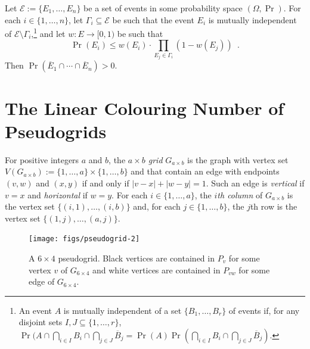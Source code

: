 \documentclass{patmorin}
\newcommand{\defin}[1]{\emph{\color{brown}#1}}
\begin{document}
\begin{lem}\label{weighted_lovasz}
  Let $\mathcal{E}:=\{E_1,\ldots,E_n\}$ be a set of events in some probability space $(\Omega,\Pr)$.  For each $i\in\{1,\ldots,n\}$, let $\Gamma_i\subseteq \mathcal{E}$ be such that the event $E_i$ is mutually independent of $\mathcal{E}\setminus \Gamma_i$,\footnote{An event $A$ is mutually independent of a set $\{B_1,\ldots,B_r\}$ of events if, for any disjoint sets $I,J\subseteq\{1,\ldots,r\}$, $\Pr(A\cap\bigcap_{i\in I} B_i\cap\bigcap_{j\in J} \overline{B}_j=\Pr(A)\Pr(\bigcap_{i\in I} B_i\cap\bigcap_{j\in J} \overline{B}_j)$.} and let $w:E\to[0,1)$ be such that
  \[
      \Pr(E_i) \le w(E_i)\cdot\prod_{E_j\in\Gamma_i}(1-w(E_j))  \enspace .
  \]
  Then $\Pr(\overline{E}_1\cap\cdots\cap\overline{E}_n) > 0$.
\end{lem}


\section{The Linear Colouring Number of Pseudogrids}

For positive integers $a$ and $b$, the \emph{$a\times b$ grid} $G_{a\times b}$ is the graph with vertex set $V(G_{a\times b}):=\{1,\ldots,a\}\times\{1,\ldots,b\}$ and that contain an edge with endpoints $(v,w)$ and $(x,y)$ if and only if $|v-x|+|w-y|=1$.  Such an edge is \defin{vertical} if $v=x$ and \defin{horizontal} if $w=y$.  For each $i\in\{1,\ldots,a\}$, the \emph{$i$th column} of $G_{a\times b}$ is the vertex set $\{(i,1),\ldots,(i,b)\}$ and, for each $j\in\{1,\ldots,b\}$, the $j$th row is the vertex set $\{(1,j),\ldots,(a,j)\}$.

\begin{figure}
  \begin{center}
    \texttt{[image: figs/pseudogrid-2]}
  \end{center}
  \caption{A $6\times 4$ pseudogrid.  Black vertices are contained in $P_v$ for some vertex $v$ of $G_{6\times 4}$ and white vertices are contained in $P_{vw}$ for some edge of $G_{6\times 4}$.}
  \label{pseudogrid_fig}
\end{figure}
\end{document}
